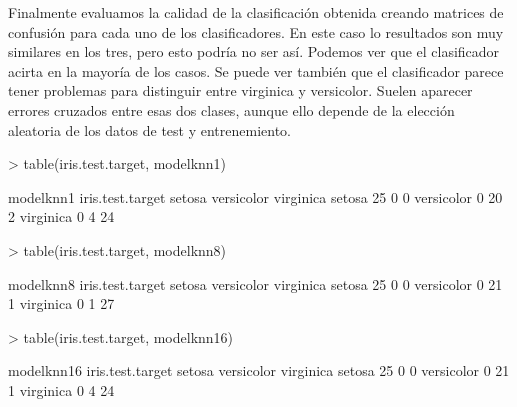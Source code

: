 \documentclass [a4paper] {article}
\begin{document}
Finalmente evaluamos la calidad de la clasificación obtenida creando matrices de confusión para cada uno de los clasificadores.
En este caso lo resultados son muy similares en los tres, pero esto podría no ser así.
Podemos ver que el clasificador acirta en la mayoría de los casos.
Se puede ver también que el clasificador parece tener problemas para distinguir entre virginica y versicolor.
Suelen aparecer errores cruzados entre esas dos clases, aunque ello depende de la elección aleatoria de los datos de test y entrenemiento.
\begin{Schunk}
\begin{Sinput}
> table(iris.test.target, modelknn1)
\end{Sinput}
\begin{Soutput}
                modelknn1
iris.test.target setosa versicolor virginica
      setosa         25          0         0
      versicolor      0         20         2
      virginica       0          4        24
\end{Soutput}
\begin{Sinput}
> table(iris.test.target, modelknn8)
\end{Sinput}
\begin{Soutput}
                modelknn8
iris.test.target setosa versicolor virginica
      setosa         25          0         0
      versicolor      0         21         1
      virginica       0          1        27
\end{Soutput}
\begin{Sinput}
> table(iris.test.target, modelknn16)
\end{Sinput}
\begin{Soutput}
                modelknn16
iris.test.target setosa versicolor virginica
      setosa         25          0         0
      versicolor      0         21         1
      virginica       0          4        24
\end{Soutput}
\end{Schunk}

\newpage
\end{document}
